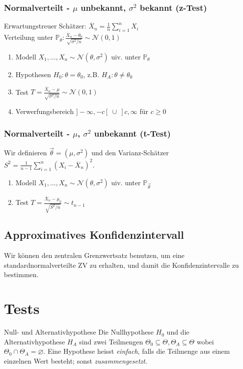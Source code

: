 \documentclass[a4paper,10pt]{article}
\def\P{\mathbb{P}}
\begin{document}
\subsubsection*{\texorpdfstring{Normalverteilt - \(\mu\) unbekannt, \(\sigma^2\) bekannt (z-Test)}{Normalverteilt - μ unbekannt, σ² bekannt (z-Test)}}
Erwartungstreuer Schätzer: \(\overline{X}_n = \frac{1}{n} \sum_{i=1}^n X_i\)\\
Verteilung unter \(\P_\theta: \frac{\overline{X}_n - \theta_0}{\sqrt{\sigma^2/n}} \sim \mathcal{N}(0,1)\)
\begin{enumerate}
	\item Modell \(X_1, \ldots, X_n \sim \mathcal{N}(\theta, \sigma^2)\) uiv. unter \(\P_\theta\)
	\item Hypothesen \(H_0 : \theta = \theta_0\), z.B. \(H_A : \theta \ne \theta_0\)
	\item Test \(T = \frac{\overline{X}_n - \mu}{\sqrt{\sigma^2/n}} \sim \mathcal{N}(0,1)\)
	\item Verwerfungsbereich \(]-\infty, -c[ \ \cup \ ] c, \infty\) für \(c\ge 0\)
\end{enumerate}

\subsubsection*{\texorpdfstring{Normalverteilt - \(\mu\), \(\sigma^2\) unbekannt (t-Test)}{Normalverteilt - μ, σ² unbekannt (t-Test)}}
Wir definieren \(\vec{\theta} = (\mu, \sigma^2)\) und den Varianz-Schätzer \(S^2 = \frac{1}{n-1}\sum_{i=1}^n (X_i - \overline{X}_n)^2\).
\begin{enumerate}
	\item Modell \(X_1, \ldots, X_n \sim \mathcal{N}(\theta, \sigma^2)\) uiv. unter \(\P_{\vec{\theta}}\)
	\item Test \(T = \frac{\overline{X}_n - \mu_0}{\sqrt{S^2/n}} \sim t_{n-1}\)
\end{enumerate}

\subsection{Approximatives Konfidenzintervall}
Wir können den zentralen Grenzwertsatz benutzen, um eine standardnormalverteilte ZV zu erhalten, und damit die Konfidenzintervalle zu bestimmen.

\section{Tests}
\begin{subbox}{Null- und Alternativhypothese}
	Die Nullhypothese \(H_0\) und die Alternativhypothese \(H_A\) sind zwei Teilmengen \(\Theta_0 \subseteq \Theta, \Theta_A \subseteq \Theta\) wobei \(\Theta_0 \cap \Theta_A = \varnothing\). Eine Hypothese heisst \textit{einfach}, falls die Teilmenge aus einem einzelnen Wert besteht; sonst \textit{zusammengesetzt}.
\end{subbox}
\end{document}
